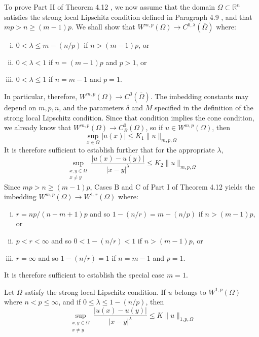 \begin{para}
  To prove Part II of Theorem 4.12 , we now assume that the domain $\Omega \subset \mathbb{R}^n$ satisfies the strong local Lipschitz condition defined in Paragraph 4.9 , and that $m p>n \geq(m-1) p$. We shall show that $W^{m,p}(\Omega) \rightarrow C^{0, \lambda}(\overline{\Omega})$ where:
  \begin{enumerate}[(i)]
    \item $0<\lambda \leq m-(n / p)$ if $n>(m-1) p$, or
    \item $0<\lambda<1$ if $n=(m-1) p$ and $p>1$, or
    \item $0<\lambda \leq 1$ if $n=m-1$ and $p=1$.
  \end{enumerate}
  In particular, therefore, $W^{m,p}(\Omega) \rightarrow C^0(\overline{\Omega})$. The imbedding constants may depend on $m, p, n$, and the parameters $\delta$ and $M$ specified in the definition of the strong local Lipschitz condition. Since that condition implies the cone condition, we already know that $W^{m,p}(\Omega) \rightarrow C_B^0(\Omega)$, so if $u \in W^{m, p}(\Omega)$, then
  \[
  \sup _{x \in \Omega}|u(x)| \leq K_1\|u\|_{m, p, \Omega}
  \]
  It is therefore sufficient to establish further that for the appropriate $\lambda$,
  \[
  \sup _{\substack{x, y \in \Omega \\ x \neq y}} \frac{|u(x)-u(y)|}{|x-y|^\lambda} \leq K_2\|u\|_{m, p, \Omega}
  \]
  Since $m p>n \geq(m-1) p$, Cases $\mathrm{B}$ and $\mathrm{C}$ of Part I of Theorem 4.12 yields the imbedding $W^{m,p}(\Omega) \rightarrow W^{1, r}(\Omega)$ where:
  \begin{enumerate}[(i)]
    \item $r=n p /(n-m+1) p$ and so $1-(n / r)=m-(n / p)$ if $n>(m-1) p$, or
    \item $p<r<\infty$ and so $0<1-(n / r)<1$ if $n>(m-1) p$, or
    \item $r=\infty$ and so $1-(n / r)=1$ if $n=m-1$ and $p=1$.
  \end{enumerate}
  It is therefore sufficient to establish the special case $m=1$.
\end{para}


\begin{lemma}
  Let $\Omega$ satisfy the strong local Lipschitz condition. If $u$ belongs to $W^{1, p}(\Omega)$ where $n<p \leq \infty$, and if $0 \leq \lambda \leq 1-(n / p)$, then
  \[
  \sup _{\substack{x, y \in \Omega \\ x \neq y}} \frac{|u(x)-u(y)|}{|x-y|^\lambda} \leq K\|u\|_{1, p, \Omega}
  \]
\end{lemma}

